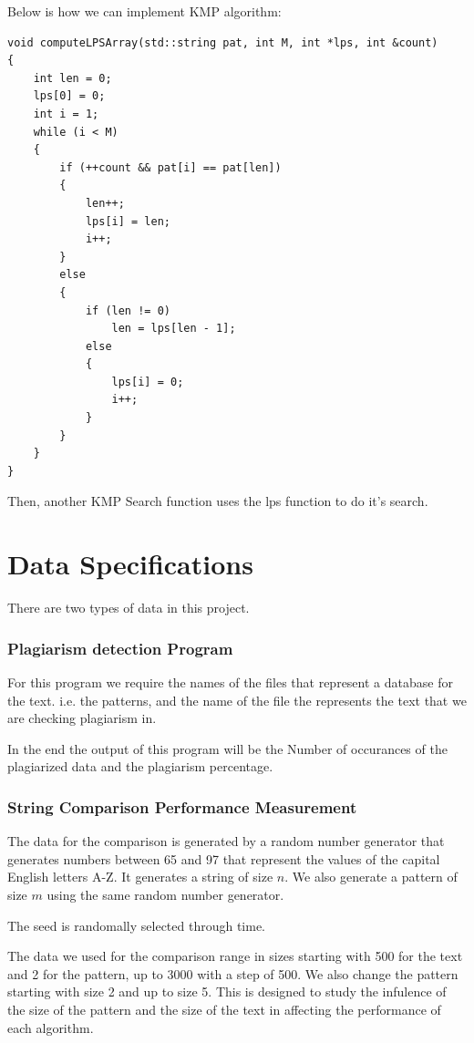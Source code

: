 \documentclass{article}
\theoremstyle{plain}
\begin{document}
Below is how we can implement KMP algorithm:
\begin{verbatim}
void computeLPSArray(std::string pat, int M, int *lps, int &count)
{
    int len = 0;
    lps[0] = 0;
    int i = 1;
    while (i < M)
    {
        if (++count && pat[i] == pat[len])
        {
            len++;
            lps[i] = len;
            i++;
        }
        else
        {
            if (len != 0)
                len = lps[len - 1];
            else
            {
                lps[i] = 0;
                i++;
            }
        }
    }
}        
\end{verbatim}
Then, another KMP Search function uses the lps function to do it's search.

\newpage

\section*{Data Specifications}
There are two types of data in this project.

\subsubsection*{Plagiarism detection Program}

For this program we require the names of the files that represent a database for the text. i.e. the patterns, and the name of the file the represents the text that we are checking plagiarism in.

In the end the output of this program will be the Number of occurances of the plagiarized data and the plagiarism percentage.


\subsubsection*{String Comparison Performance Measurement}

The data for the comparison is generated by a random number generator that generates numbers between 65 and 97 that represent the values of the capital English letters A-Z. It generates a string of size $n$.
We also generate a pattern of size $m$ using the same random number generator.

\noindent The seed is randomally selected through time.

The data we used for the comparison range in sizes starting with 500 for the text and 2 for the pattern, up to 3000 with a step of 500.
We also change the pattern starting with size 2 and up to size 5. This is designed to study the infulence of the size of the pattern and the size of the text in affecting the performance of each algorithm.
\end{document}
